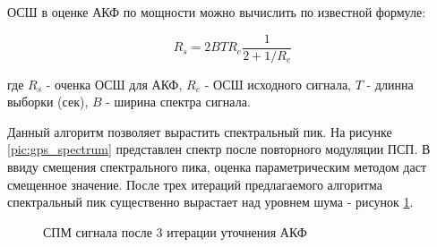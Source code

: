 ОСШ в оценке АКФ по мощности можно вычислить по известной формуле:
\begin{center}
\begin{equation}
	\label{eq:akf_max_eq}
	R_s=2 B T R_e \frac{1}{2+1/R_e}
\end{equation}
\end{center}
где ${R_s}$ - оченка ОСШ для АКФ, ${R_e}$ - ОСШ исходного сигнала, ${T}$ - длинна выборки (сек), ${B}$ -  ширина спектра сигнала.

Данный алгоритм позволяет вырастить спектральный пик. На рисунке \ref{pic:gps_spectrum} представлен спектр после повторного
модуляции ПСП. В ввиду смещения спектрального пика, оценка параметрическим методом даст смещенное значение. После трех 
итераций предлагаемого алгоритма спектральный пик существенно вырастает над уровнем шума - рисунок \ref{pic:GPS_spectrum_iter3}.

\begin{figure}[H]
	\center{}
	\caption{СПМ сигнала после 3 итерации уточнения АКФ}
	\label{pic:GPS_spectrum_iter3}
\end{figure}


